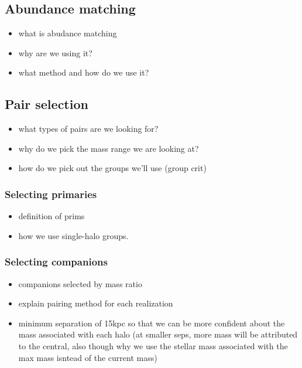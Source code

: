 \documentclass[twocolumn]{aastex631}
\begin{document}
\subsection{Abundance matching} \label{sec:methods-am}
    \begin{itemize}
        \item what is abudance matching
        \item why are we using it?
        \item what method and how do we use it? 
    \end{itemize} 

\subsection{Pair selection}\label{sec:methods-pairs}
    \begin{itemize}
        \item what types of pairs are we looking for? 
        \item why do we pick the mass range we are looking at?
        \item how do we pick out the groups we'll use (group crit)
    \end{itemize}
    \subsubsection{Selecting primaries}
            \begin{itemize}
                \item definition of prims
                \item how we use single-halo groups. 
            \end{itemize}
    \subsubsection{Selecting companions}
            \begin{itemize}
                \item companions selected by mass ratio
                \item explain pairing method for each realization
                \item minimum separation of 15kpc so that we can be more confident about the mass associated with each halo (at smaller seps, more mass will be attributed to the central, also though why we use the stellar mass associated with the max mass isntead of the current mass) 
            \end{itemize}
    
\end{document}
